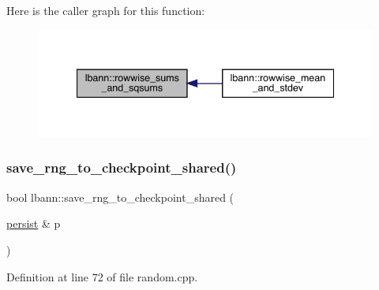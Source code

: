 Here is the caller graph for this function\+:\nopagebreak
\begin{figure}[H]
\begin{center}
\leavevmode
\includegraphics[width=340pt]{namespacelbann_a6b342b3e5b3fbb08b97b6d90aa68d121_icgraph}
\end{center}
\end{figure}
\mbox{\label{namespacelbann_af68acf5b249e5360289d4c6a7bfa8985}} 
\subsubsection{\texorpdfstring{save\+\_\+rng\+\_\+to\+\_\+checkpoint\+\_\+shared()}{save\_rng\_to\_checkpoint\_shared()}}
{\footnotesize\ttfamily bool lbann\+::save\+\_\+rng\+\_\+to\+\_\+checkpoint\+\_\+shared (\begin{DoxyParamCaption}\item[{\hyperlink{classlbann_1_1persist}{persist} \&}]{p }\end{DoxyParamCaption})}



Definition at line 72 of file random.\+cpp.


